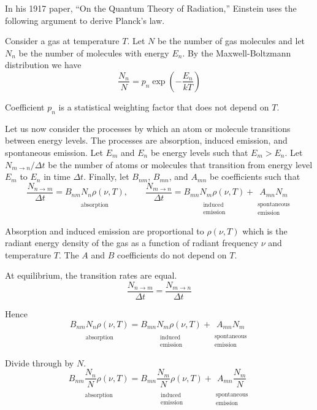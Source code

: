 \documentclass[12pt]{article}
\newcommand\BNM{B_{nm}} %
\newcommand\BMN{B_{mn}} %
\newcommand\AMN{A_{mn}} %
\newcommand\RHO{\rho(\nu,T)}
\newcommand\ABSORPTION{\substack{\\[1ex] \text{absorption}}}
\newcommand\INDUCED{\substack{\\[1ex] \text{induced}\\ \text{emission}}}
\newcommand\SPONTANEOUS{\substack{\\[1ex] \text{spontaneous}\\ \text{emission}}}
\begin{document}
\noindent
In his 1917 paper, ``On the Quantum Theory of Radiation,''
Einstein uses the following argument to derive Planck's law.

\bigskip
\noindent
Consider a gas at temperature $T$.
Let $N$ be the number of gas molecules
and let $N_n$ be the number of molecules with energy $E_n$.
By the Maxwell-Boltzmann distribution we have
\begin{equation*}
\frac{N_n}{N}=p_n\exp\left(-\frac{E_n}{kT}\right)
\tag{1}
\end{equation*}

\noindent
Coefficient $p_n$ is a statistical weighting factor that does not depend on $T$.

\bigskip
\noindent
Let us now consider the processes by which an atom or molecule transitions between energy levels.
The processes are absorption, induced emission, and spontaneous emission.
Let $E_m$ and $E_n$ be energy levels such that $E_m>E_n$.
Let $N_{m\rightarrow n}/\Delta t$ be the number of atoms or molecules that transition from energy level $E_m$ to $E_n$ in time $\Delta t$.
Finally, let $\BNM$, $\BMN$, and $\AMN$ be coefficients such that
\begin{equation*}
\frac{N_{n\rightarrow m}}{\Delta t}
=\underset{\ABSORPTION}{\BNM N_n \RHO},
\qquad
\frac{N_{m\rightarrow n}}{\Delta t}
=\underset{\INDUCED}{\BMN N_m \RHO}
+
\underset{\SPONTANEOUS}{\AMN N_m}
\end{equation*}

\noindent
Absorption and induced emission are proportional to $\RHO$
which is the radiant energy density of the gas
as a function of radiant frequency $\nu$ and temperature $T$.
The $A$ and $B$ coefficients do not depend on $T$.

\bigskip
\noindent
At equilibrium, the transition rates are equal.
\begin{equation*}
\frac{N_{n\rightarrow m}}{\Delta t}=\frac{N_{m\rightarrow n}}{\Delta t}
\end{equation*}

\noindent
Hence
\begin{equation*}
\underset{\ABSORPTION}{\BNM N_n \RHO}
=\underset{\INDUCED}{\BMN N_m \RHO}
+\underset{\SPONTANEOUS}{\AMN N_m}
\end{equation*}

\noindent
Divide through by $N$.
\begin{equation*}
\underset{\ABSORPTION}{\BNM \frac{N_n}{N} \RHO}
=\underset{\INDUCED}{\BMN \frac{N_m}{N} \RHO}
+\underset{\SPONTANEOUS}{\AMN \frac{N_m}{N}}
\end{equation*}
\end{document}
